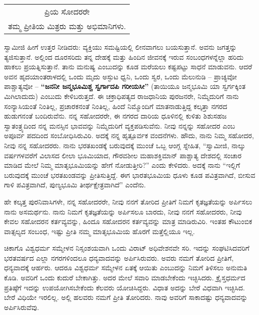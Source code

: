 \begin{longtable}[r]{@{}c@{}}
ಪ್ರಿಯ ಸೋದರರೇ \\
ತಮ್ಮ ಪ್ರೀತಿಯ ಮಿತ್ರರು ಮತ್ತು ಅಭಿಮಾನಿಗಳು. \\
\end{longtable}

ಸ್ವಾಮೀಜಿ ಹೀಗೆ ಉತ್ತರ ನೀಡಿದರು: ವ್ಯಕ್ತಿಯು ಸಮಷ್ಟಿಯಲ್ಲಿ ಲೀನವಾಗಲು ಬಯಸುತ್ತಾನೆ. ಅವನು ಜಗತ್ತನ್ನು ತ್ಯಜಿಸುತ್ತಾನೆ. ಅಲ್ಲಿಂದ ದೂರಸರಿದು ತನ್ನ ದೇಹಕ್ಕೆ ಮತ್ತು ಹಿಂದಿನ ಜೀವನಕ್ಕೆ ಇರುವ ಸಂಬಂಧಗಳನ್ನೆಲ್ಲಾ ಹರಿದು ಹಾಕಲು ಪ್ರಯತ್ನಿಸುತ್ತಾನೆ. ತಾನು ಮನುಷ್ಯ ಎಂಬುದನ್ನು ಕೂಡ ಮರೆಯಲು ಕಷ್ಟಪಟ್ಟು ಸಾಧನೆ ಮಾಡುವನು. ಆದರೆ ಅವನ ಹೃದಯಾಂತರಾಳದಲ್ಲಿ ಒಂದು ಮೃದು ಅಸ್ಫುಟ ಧ್ವನಿ, ಒಂದು ಸ್ವರ, ಒಂದು ಮೆಲುನುಡಿ – ಪ್ರಾಚ್ಯವೋ ಪಾಶ್ಚಾತ್ಯವೋ – \textbf{“ಜನನೀ ಜನ್ಮಭೂಮಿಶ್ಚ ಸ್ವರ್ಗಾದಪಿ ಗರೀಯಸೀ”} (ತಾಯಿಯೂ ಜನ್ಮಭೂಮಿ ಯಾ ಸ್ವರ್ಗಕ್ಕಿಂತ ಮಿಗಿಲಾದುದು) ಎಂಬುದು ಕೇಳಿಬರುತ್ತದೆ. ಈ ಚಕ್ರಾಧಿಪತ್ಯದ ರಾಜಧಾನಿಯ ಪುರಜನರೇ, ನಿಮ್ಮೆದುರಿಗೆ ನಾನು ಸಂನ್ಯಾಸಿಯಂತೆ ನಿಂತಿಲ್ಲ, ಪ್ರಚಾರಕನಂತೆ ನಿಂತಿಲ್ಲ, ಹಿಂದೆ ನಿಮ್ಮೊಂದಿಗೆ ಮಾತನಾಡುತ್ತಿದ್ದ ಕಲ್ಕತ್ತಾ ನಗರದ ಹುಡುಗನಂತೆ ಬಂದಿರುವೆನು. ನನ್ನ ಸಹೋದರರೇ, ಈ ನಗರದ ದಾರಿಯ ಧೂಳಿನಲ್ಲಿ ಕುಳಿತು ಶಿಶುಸಹಜ ಸ್ವಾತಂತ್ರ್ಯದಿಂದ ನನ್ನ ಮನಸ್ಸಿನ ಭಾವವನ್ನು ನಿಮ್ಮೆದುರಿಗೆ ವ್ಯಕ್ತಪಡಿಸುವೆನು. ನೀವು ನನ್ನನ್ನು ಸಹೋದರ ಎಂಬ ಅಪೂರ್ವ ಪದದಿಂದ ಸಂಬೋಧಿಸಿರುವಿರಿ. ಅದಕ್ಕೆ ನನ್ನ ಹೃತ್ಪೂರ್ವಕ ವಂದನೆಗಳು. ಹೌದು, ನಾನು ನಿಮ್ಮ ಸಹೋದರ, ನೀವು ನನ್ನ ಸಹೋದರರು. ನಾನು ಭರತಖಂಡಕ್ಕೆ ಬರುವುದಕ್ಕೆ ಮುಂಚೆ ಒಬ್ಬ ಆಂಗ್ಲ ಸ್ನೇಹಿತ, “ಸ್ವಾಮೀಜಿ, ನಾಲ್ಕು ವರ್ಷಗಳವರೆಗೆ ವಿಲಾಸದ ಲೀಲಾ ಭೂಮಿಯಾದ, ಗೌರವಶೀಲ ಮಹಾಶಕ್ತಿಮಾನ್​ ಪಾಶ್ಚಾತ್ಯ ದೇಶದಲ್ಲಿ ಸಂಚಾರ ಮಾಡಿದ ಮೇಲೆ ನಿಮ್ಮ ಮಾತೃಭೂಮಿಯನ್ನು ಹೇಗೆ ನೋಡುತ್ತೀರಿ?” ಎಂದು ಕೇಳಿದರು. ಅದಕ್ಕೆ ನಾನು “ಇಲ್ಲಿಗೆ ಬರುವುದಕ್ಕೆ ಮುಂಚೆ ಭರತಖಂಡವನ್ನು ಪ್ರೀತಿಸುತ್ತಿದ್ದೆ. ಈಗ ಭಾರತಭೂಮಿಯ ಧೂಳು ಕೂಡ ಪವಿತ್ರವಾಗಿದೆ, ಬೀಸುವ ಗಾಳಿ ಪವಿತ್ರವಾಗಿದೆ, ಪುಣ್ಯಭೂಮಿ ತೀರ್ಥಕ್ಷೇತ್ರವಾಗಿದೆ” ಎಂದೆನು.

ಹೇ ಕಲ್ಕತ್ತ ಪುರನಿವಾಸಿಗಳೇ, ನನ್ನ ಸಹೋದರರೇ, ನೀವು ನನಗೆ ತೋರಿದ ಪ್ರೀತಿಗೆ ನಿಮಗೆ ಕೃತಜ್ಞತೆಯನ್ನು ಅರ್ಪಿಸಲು ನಾನು ಅಸಮರ್ಥನು. ನಾನು ನಿಮಗೆ ಕೃತಜ್ಞತೆಯನ್ನು ಅರ್ಪಿಸಲೂ ಬಾರದು, ನೀವು ನನಗೆ ಸಹೋದರರು, ನೀವು ಕೇವಲ ಸಹೋದರನ ಕರ್ತವ್ಯವನ್ನು, ಹಿಂದೂ ಸಹೋದರನ ಕರ್ತವ್ಯವನ್ನು ಮಾತ್ರ ಮಾಡಿರುವಿರಿ. ಇಂತಹ ಕೌಟುಂಬಿಕ ವಾತ್ಸಲ್ಯದ ಸಂಬಂಧ, ಇಷ್ಟು ಪ್ರೀತಿ ನಮ್ಮ ಮಾತೃಭೂಮಿಯ ಹೊರಗೆ ಮತ್ತೆಲ್ಲಿಯೂ ಇಲ್ಲ.

ಚಿಕಾಗೊ ವಿಶ್ವಧರ್ಮ ಸಮ್ಮೇಳನ ನಿಸ್ಸಂಶಯವಾಗಿ ಒಂದು ವಿರಾಟ್​ ಅಧಿವೇಶನವೇ ಸರಿ. ಇದನ್ನು ಸಂಘಟಿಸಿದವರಿಗೆ ಭರತವರ್ಷದ ಎಲ್ಲಾ ನಗರಗಳಿಂದಲೂ ಧನ್ಯವಾದವನ್ನು ಅರ್ಪಿಸಿರುವರು. ಅವರು ನಮಗೆ ತೋರಿದ ಪ್ರೀತಿಗೆ, ಧನ್ಯವಾದಕ್ಕೆ ಆರ್ಹರು. ಆದರೂ ವಿಶ್ವಧರ್ಮ ಸಮ್ಮೇಳನ ಏತಕ್ಕೆ ಆಯಿತು ಎಂಬುದನ್ನು ನಿಮಗೆ ತಿಳಿಸಲು ಅನುಮತಿ ಕೊಡಿ. ಅವರಿಗೆ ಒಂದು ಕುದುರೆ ಬೇಕಾಗಿತ್ತು. ಅದರ ಮೇಲೆ ಸವಾರಿ ಮಾಡಬೇಕೆಂದು ಇಚ್ಛಿಸಿದರು. ಕ್ರೈಸ್ತಧರ್ಮದ ಪ್ರತಿಷ್ಠೆಗೆ ಇದನ್ನು ಉಪಯೋಗಿಸಬೇಕೆಂದು ಕೆಲವರು ಯೋಚಿಸಿದ್ದರು. ವಿಧಾತ ಅದನ್ನು ಬೇರೆ ವಿಧವಾಗಿ ಇಚ್ಛಿಸಿದ. ಬೇರೆ ವಿಧಿಯೇ ಇರಲಿಲ್ಲ. ಅಲ್ಲಿ ಹಲವರು ನಮಗೆ ಪ್ರೀತಿ ತೋರಿದರು. ನಾವು ಅವರಿಗೆ ಸಾಕಾದಷ್ಟು ಧನ್ಯವಾದವನ್ನು ಅರ್ಪಿಸಿರುವೆವು.

